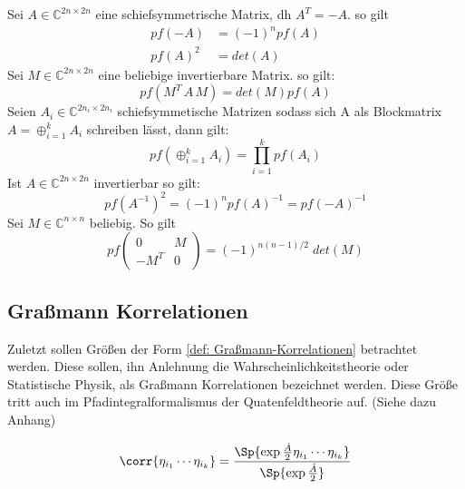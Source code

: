 \begin{grayframe}[frametitle = {Eigenschaften von Pfaffschen Determinanten}]
    Sei $A \in \mathbb{C}^{2n\times2n}$ eine schiefsymmetrische Matrix, dh $A^T = -A$. so gilt
        \begin{align}
            pf(-A) &= (-1)^n pf(A) \\
            pf(A)^2 &= det(A)
        \end{align}
    Sei $M \in \mathbb{C}^{2n\times2n} $ eine beliebige invertierbare Matrix. so gilt:
        \begin{equation}
            pf(M^T \,A\, M) = det(M) pf(A)
        \end{equation}
    Seien $A_i \in \mathbb{C}^{2n_i\times2n_i}$ schiefsymmetische Matrizen sodass sich A als Blockmatrix $A = \oplus_{i = 1}^k A_i$ schreiben lässt, dann gilt:
        \begin{equation}
            pf(\oplus_{i = 1}^k A_i) = \prod_{i=1}^k pf(A_i)
        \end{equation}
    Ist $A \in \mathbb{C}^{2n\times2n}$ invertierbar so gilt:
        \begin{equation}
        pf(A^{-1})^2 = (-1)^n pf(A)^{-1} = pf(-A)^{-1}
        \end{equation}
    Sei $M \in \mathbb{C}^{n\times n} $ beliebig. So gilt
        \begin{equation}
            pf\left(
                \begin{array}{cc}
                    0    & M \\
                    -M^T & 0 
                \end{array}
            \right) = (-1)^{n(n-1)/2} \; det(M)
        \end{equation}
\end{grayframe}

\subsection{Graßmann Korrelationen}

Zuletzt sollen Größen der Form \eqref{def: Graßmann-Korrelationen} betrachtet werden. Diese sollen, ihn Anlehnung die Wahrscheinlichkeitstheorie oder Statistische Physik, als Graßmann Korrelationen bezeichnet werden. Diese Größe tritt auch im Pfadintegralformalismus der Quatenfeldtheorie auf. (Siehe dazu Anhang) 

\begin{equation} \label{def: Graßmann-Korrelationen}
\corr{\eta_{i_1} \cdots \eta_{i_k}} = \frac{\Sp{\exp{\frac{\hat{A}}{2}}\eta_{i_1} \cdots \eta_{i_k}}}{\Sp{\exp{\frac{\hat{A}}{2}}}} 
\end{equation}

